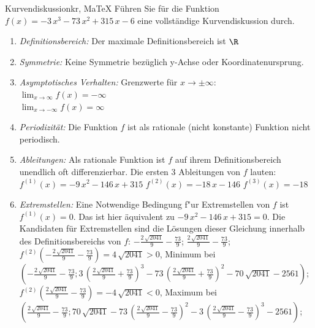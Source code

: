  \providecommand{\MoIl}{(} 
 \providecommand{\MoIr}{)}
 \providecommand{\MIntvlSep}{;} 
 \providecommand{\MElSetSep}{;} 
 \begin{MAufgabe}{Kurvendiskussion}{kr, MaTeX}
 F\"uhren Sie f\"ur die Funktion $f(x)= - 3\, x^3 - 73\, x^2 + 315\, x - 6$ eine vollst\"andige Kurvendiskussion durch.\\ 
 \ifLsg\Loesung
 \begin{enumerate}
 \item \emph{Definitionsbereich:} 
 Der maximale Definitionsbereich ist $\R$\item \emph{Symmetrie:} 
 Keine Symmetrie bez\"uglich y-Achse oder Koordinatenursprung.\item \emph{Asymptotisches Verhalten:} 
 Grenzwerte f\"ur $x\rightarrow \pm \infty$: \\ 
 $\lim_{x\rightarrow \infty} f(x)=- \infty$ \\ 
 $\lim_{x\rightarrow -\infty} f(x)=\infty$ \\ 
 \item \emph{Periodizit\"at:} 
 Die Funktion $f$ ist als rationale (nicht konstante) Funktion nicht periodisch.\item \emph{Ableitungen:} 
 Als rationale Funktion ist $f$ auf ihrem Definitionsbereich unendlich oft differenzierbar. 
 Die ersten 3 Ableitungen von $f$ lauten: \\ 
 $f^{(1)}(x)= - 9\, x^2 - 146\, x + 315$\newline 
  $f^{(2)}(x)= - 18\, x - 146$\newline 
  $f^{(3)}(x)=-18$\newline 
  \item \emph{Extremstellen:} 
 Eine Notwendige Bedingung f"ur Extremstellen von $f$ ist $f^{(1)}(x)=0$. 
 Das ist hier \"aquivalent zu $ - 9\, x^2 - 146\, x + 315=0$. 
 Die Kandidaten f\"ur Extremstellen sind die L\"osungen dieser Gleichung innerhalb des Definitionsbereichs von $f$: $ - \frac{2\, \sqrt{2041}}{9} - \frac{73}{9}$; $\frac{2\, \sqrt{2041}}{9} - \frac{73}{9}$; \\ 
 $f^{(2)}( - \frac{2\, \sqrt{2041}}{9} - \frac{73}{9})=4\, \sqrt{2041}$$>0$, Minimum bei $( - \frac{2\, \sqrt{2041}}{9} - \frac{73}{9};3\, {\left(\frac{2\, \sqrt{2041}}{9} + \frac{73}{9}\right)}^3 - 73\, {\left(\frac{2\, \sqrt{2041}}{9} + \frac{73}{9}\right)}^2 - 70\, \sqrt{2041} - 2561)$; \\ 
 $f^{(2)}(\frac{2\, \sqrt{2041}}{9} - \frac{73}{9})=- 4\, \sqrt{2041}$$<0$, Maximum bei $(\frac{2\, \sqrt{2041}}{9} - \frac{73}{9};70\, \sqrt{2041} - 73\, {\left(\frac{2\, \sqrt{2041}}{9} - \frac{73}{9}\right)}^2 - 3\, {\left(\frac{2\, \sqrt{2041}}{9} - \frac{73}{9}\right)}^3 - 2561)$; \\ 

\end{enumerate}
\end{MAufgabe}
